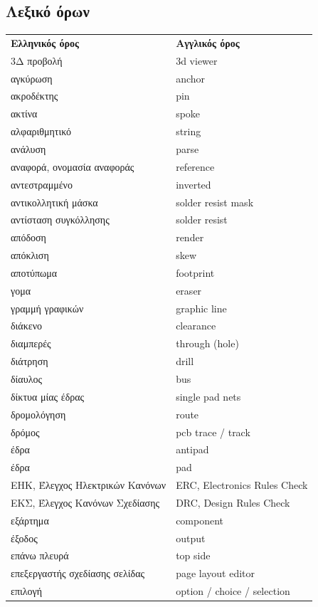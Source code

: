 \documentclass[a4paper]{article}
\begin{document}
\subsection{Λεξικό όρων}
\begin{longtabu}{ l l }
    \textbf{Ελληνικός όρος}	&	\textbf{Αγγλικός όρος}	\\
    3Δ προβολή	&	3d viewer	\\
    αγκύρωση	&	anchor	\\
    ακροδέκτης	&	pin	\\
    ακτίνα	&	spoke	\\
    αλφαριθμητικό	&	string	\\
    ανάλυση	&	parse	\\
    αναφορά, ονομασία αναφοράς	&	reference	\\
    αντεστραμμένο	&	inverted	\\
    αντικολλητική μάσκα	&	solder resist mask	\\
    αντίσταση συγκόλλησης	&	solder resist	\\
    απόδοση	&	render	\\
    απόκλιση	&	skew	\\
    αποτύπωμα	&	footprint	\\
    γομα	&	eraser	\\
    γραμμή γραφικών	&	graphic line	\\
    διάκενο	&	clearance	\\
    διαμπερές	&	through (hole)	\\
    διάτρηση	&	drill	\\
    δίαυλος	&	bus	\\
    δίκτυα μίας έδρας	&	single pad nets	\\
    δρομολόγηση	&	route	\\
    δρόμος	&	pcb trace / track	\\
    έδρα	&	antipad	\\
    έδρα	&	pad	\\
    ΕΗΚ, Έλεγχος Ηλεκτρικών Κανόνων	&	ERC, Electronics Rules Check	\\
    ΕΚΣ, Έλεγχος Κανόνων Σχεδίασης	&	DRC, Design Rules Check	\\
    εξάρτημα	&	component	\\
    έξοδος	&	output	\\
    επάνω πλευρά	&	top side	\\
    επεξεργαστής σχεδίασης σελίδας	&	page layout editor	\\
    επιλογή	&	option / choice / selection	\\

\end{longtabu}
\end{document}
